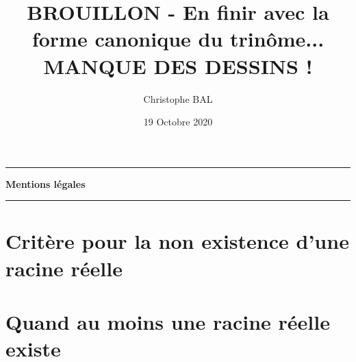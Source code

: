 \documentclass[12pt]{amsart}
\begin{document}
\title{BROUILLON - En finir avec la forme canonique du trinôme... \\ MANQUE DES DESSINS !}
\author{Christophe BAL}
\date{19 Octobre 2020}
\maketitle


\begin{center}
	\hrule\vspace{.3em}
	{
		\fontsize{1.35em}{1em}\selectfont
		\textbf{Mentions \og légales \fg}
	}
			
	\vspace{0.45em}
	\doclicenseThis
	\hrule
\end{center}



\setcounter{tocdepth}{2}
\tableofcontents




\newpage
\section{Critère pour la non existence d'une racine réelle}






\section{Quand au moins une racine réelle existe}


\end{document}
